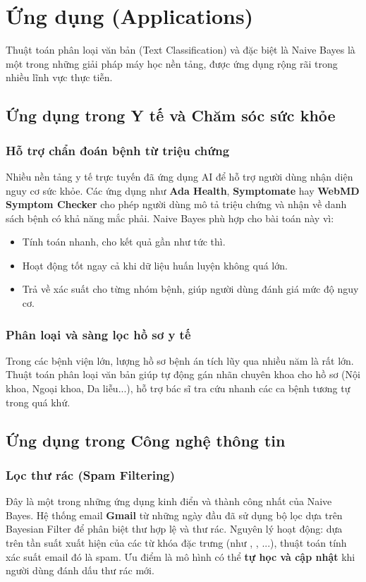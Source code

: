 \documentclass[12pt,a4paper]{report}
\begin{document}
\chapter{Ứng dụng (Applications)}
Thuật toán phân loại văn bản (Text Classification) và đặc biệt là Naive Bayes là một trong những giải pháp máy học nền tảng, được ứng dụng rộng rãi trong nhiều lĩnh vực thực tiễn.

\section{Ứng dụng trong Y tế và Chăm sóc sức khỏe}

\subsection{Hỗ trợ chẩn đoán bệnh từ triệu chứng}
Nhiều nền tảng y tế trực tuyến đã ứng dụng AI để hỗ trợ người dùng nhận diện nguy cơ sức khỏe. Các ứng dụng như \textbf{Ada Health}, \textbf{Symptomate} hay \textbf{WebMD Symptom Checker} cho phép người dùng mô tả triệu chứng và nhận về danh sách bệnh có khả năng mắc phải. Naive Bayes phù hợp cho bài toán này vì:
\begin{itemize}
    \item Tính toán nhanh, cho kết quả gần như tức thì.
    \item Hoạt động tốt ngay cả khi dữ liệu huấn luyện không quá lớn.
    \item Trả về xác suất cho từng nhóm bệnh, giúp người dùng đánh giá mức độ nguy cơ.
\end{itemize}

\subsection{Phân loại và sàng lọc hồ sơ y tế}
Trong các bệnh viện lớn, lượng hồ sơ bệnh án tích lũy qua nhiều năm là rất lớn. Thuật toán phân loại văn bản giúp tự động gán nhãn chuyên khoa cho hồ sơ (Nội khoa, Ngoại khoa, Da liễu...), hỗ trợ bác sĩ tra cứu nhanh các ca bệnh tương tự trong quá khứ.

\section{Ứng dụng trong Công nghệ thông tin}

\subsection{Lọc thư rác (Spam Filtering)}
Đây là một trong những ứng dụng kinh điển và thành công nhất của Naive Bayes. Hệ thống email \textbf{Gmail} từ những ngày đầu đã sử dụng bộ lọc dựa trên Bayesian Filter để phân biệt thư hợp lệ và thư rác. Nguyên lý hoạt động: dựa trên tần suất xuất hiện của các từ khóa đặc trưng (như , , ...), thuật toán tính xác suất email đó là spam. Ưu điểm là mô hình có thể \textbf{tự học và cập nhật} khi người dùng đánh dấu thư rác mới.
\end{document}
